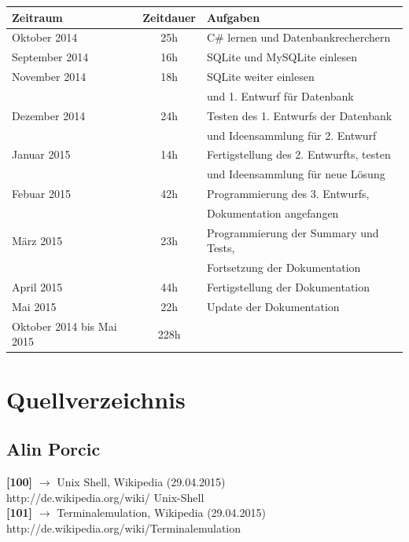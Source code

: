 \documentclass[12pt,a4paper]{report}
\begin{document}
\begin{onehalfspace}
\begin{center}
\begin{tabular}{|l|c|l|}
\hline
\textbf{Zeitraum} & \textbf{Zeitdauer} & \textbf{Aufgaben} \\ \hline \hline
Oktober 2014 & 25h & C\# lernen und Datenbankrecherchern\\ \hline
September 2014 & 16h & SQLite und MySQLite einlesen\\ \hline
November 2014 & 18h & SQLite weiter einlesen \\&& und 1. Entwurf für Datenbank\\ \hline
Dezember 2014 & 24h & Testen des 1. Entwurfs der Datenbank \\&& und Ideensammlung für 2. Entwurf\\ \hline
Januar 2015 & 14h & Fertigstellung des 2. Entwurfts, testen \\&& und Ideensammlung für neue Lösung\\ \hline
Febuar 2015 & 42h & Programmierung des 3. Entwurfs,\\&& Dokumentation angefangen\\ \hline
März 2015 & 23h & Programmierung der Summary und Tests,\\&& Fortsetzung der Dokumentation\\ \hline
April 2015 & 44h & Fertigstellung der Dokumentation\\ \hline
Mai 2015 & 22h & Update der Dokumentation\\
\hline \hline
Oktober 2014 bis Mai 2015 & 228h &\\ \hline

\end{tabular}
\end{center}
\part{Quellverzeichnis}

\chapter{Alin Porcic}

\noindent
\textbf{[100]} $\rightarrow$ Unix Shell, Wikipedia (29.04.2015)\\
http://de.wikipedia.org/wiki/ Unix-Shell\\

\noindent
\textbf{[101]} $\rightarrow$ Terminalemulation, Wikipedia (29.04.2015)\\
http://de.wikipedia.org/wiki/Terminalemulation\\


\end{onehalfspace}
\end{document}
